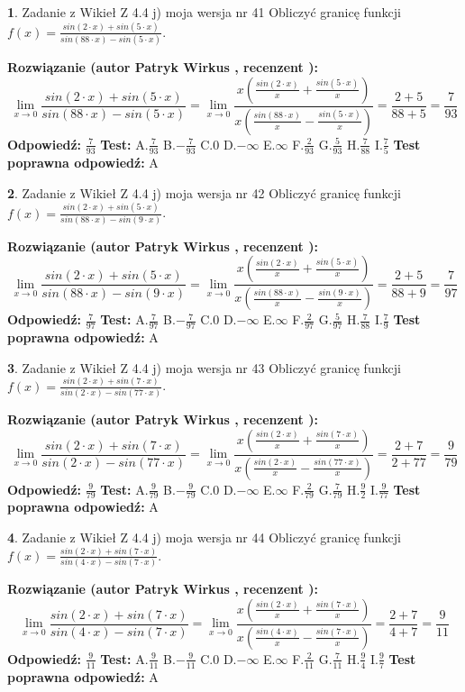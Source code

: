 \documentclass[12pt, a4paper]{article}
\theoremstyle{definition} %
\newtheorem{zad}{}
\newcommand{\zadStart}[1]{\begin{zad}#1\newline}
\newcommand{\zadStop}{\end{zad}}
\newcommand{\rozwStart}[2]{\noindent \textbf{Rozwiązanie (autor #1 , recenzent #2): }\newline}
\newcommand{\rozwStop}{\newline}
\newcommand{\odpStart}{\noindent \textbf{Odpowiedź:}\newline}
\newcommand{\odpStop}{\newline}
\newcommand{\testStart}{\noindent \textbf{Test:}\newline}
\newcommand{\testStop}{\newline}
\newcommand{\kluczStart}{\noindent \textbf{Test poprawna odpowiedź:}\newline}
\newcommand{\kluczStop}{\newline}
\begin{document}
\zadStart{Zadanie z Wikieł Z 4.4 j) moja wersja nr 41}
Obliczyć granicę funkcji $f(x)=\frac{sin(2\cdot x) +sin(5\cdot x)}{sin(88\cdot x) -sin(5\cdot x)}$.
\zadStop
\rozwStart{Patryk Wirkus}{}
$$\lim\limits_{x\to 0}\frac{sin(2\cdot x) +sin(5\cdot x)}{sin(88\cdot x) -sin(5\cdot x)}=\lim\limits_{x\to 0}\frac{x(\frac{sin(2\cdot x)}{x}+\frac{sin(5\cdot x)}{x})}{x(\frac{sin(88\cdot x)}{x}-\frac{sin(5\cdot x)}{x})}=\frac{2+5}{88+5} = \frac{7}{93}$$
\rozwStop
\odpStart
$\frac{7}{93}$
\odpStop
\testStart
A.$\frac{7}{93}$
B.$-\frac{7}{93}$
C.$0$
D.$-\infty$
E.$\infty$
F.$\frac{2}{93}$
G.$\frac{5}{93}$
H.$\frac{7}{88}$
I.$\frac{7}{5}$
\testStop
\kluczStart
A
\kluczStop



\zadStart{Zadanie z Wikieł Z 4.4 j) moja wersja nr 42}
Obliczyć granicę funkcji $f(x)=\frac{sin(2\cdot x) +sin(5\cdot x)}{sin(88\cdot x) -sin(9\cdot x)}$.
\zadStop
\rozwStart{Patryk Wirkus}{}
$$\lim\limits_{x\to 0}\frac{sin(2\cdot x) +sin(5\cdot x)}{sin(88\cdot x) -sin(9\cdot x)}=\lim\limits_{x\to 0}\frac{x(\frac{sin(2\cdot x)}{x}+\frac{sin(5\cdot x)}{x})}{x(\frac{sin(88\cdot x)}{x}-\frac{sin(9\cdot x)}{x})}=\frac{2+5}{88+9} = \frac{7}{97}$$
\rozwStop
\odpStart
$\frac{7}{97}$
\odpStop
\testStart
A.$\frac{7}{97}$
B.$-\frac{7}{97}$
C.$0$
D.$-\infty$
E.$\infty$
F.$\frac{2}{97}$
G.$\frac{5}{97}$
H.$\frac{7}{88}$
I.$\frac{7}{9}$
\testStop
\kluczStart
A
\kluczStop



\zadStart{Zadanie z Wikieł Z 4.4 j) moja wersja nr 43}
Obliczyć granicę funkcji $f(x)=\frac{sin(2\cdot x) +sin(7\cdot x)}{sin(2\cdot x) -sin(77\cdot x)}$.
\zadStop
\rozwStart{Patryk Wirkus}{}
$$\lim\limits_{x\to 0}\frac{sin(2\cdot x) +sin(7\cdot x)}{sin(2\cdot x) -sin(77\cdot x)}=\lim\limits_{x\to 0}\frac{x(\frac{sin(2\cdot x)}{x}+\frac{sin(7\cdot x)}{x})}{x(\frac{sin(2\cdot x)}{x}-\frac{sin(77\cdot x)}{x})}=\frac{2+7}{2+77} = \frac{9}{79}$$
\rozwStop
\odpStart
$\frac{9}{79}$
\odpStop
\testStart
A.$\frac{9}{79}$
B.$-\frac{9}{79}$
C.$0$
D.$-\infty$
E.$\infty$
F.$\frac{2}{79}$
G.$\frac{7}{79}$
H.$\frac{9}{2}$
I.$\frac{9}{77}$
\testStop
\kluczStart
A
\kluczStop



\zadStart{Zadanie z Wikieł Z 4.4 j) moja wersja nr 44}
Obliczyć granicę funkcji $f(x)=\frac{sin(2\cdot x) +sin(7\cdot x)}{sin(4\cdot x) -sin(7\cdot x)}$.
\zadStop
\rozwStart{Patryk Wirkus}{}
$$\lim\limits_{x\to 0}\frac{sin(2\cdot x) +sin(7\cdot x)}{sin(4\cdot x) -sin(7\cdot x)}=\lim\limits_{x\to 0}\frac{x(\frac{sin(2\cdot x)}{x}+\frac{sin(7\cdot x)}{x})}{x(\frac{sin(4\cdot x)}{x}-\frac{sin(7\cdot x)}{x})}=\frac{2+7}{4+7} = \frac{9}{11}$$
\rozwStop
\odpStart
$\frac{9}{11}$
\odpStop
\testStart
A.$\frac{9}{11}$
B.$-\frac{9}{11}$
C.$0$
D.$-\infty$
E.$\infty$
F.$\frac{2}{11}$
G.$\frac{7}{11}$
H.$\frac{9}{4}$
I.$\frac{9}{7}$
\testStop
\kluczStart
A
\kluczStop
\end{document}
